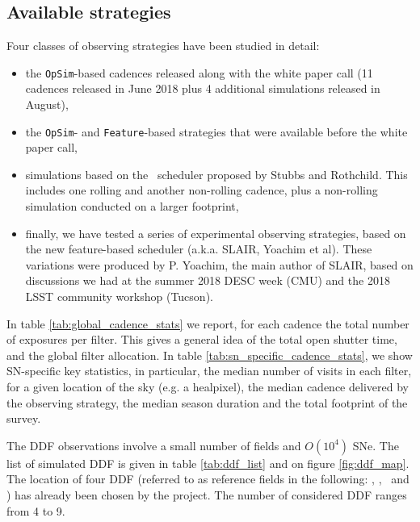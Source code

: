 
\subsection{Available strategies}

Four classes of observing strategies have been studied in detail:
\begin{itemize}

\item the {\tt OpSim}-based cadences released along with the white
  paper call (11 cadences released in June 2018 plus 4 additional
  simulations released in August), 
  
\item the {\tt OpSim}- and {\tt Feature}-based strategies that were
  available before the white paper call,

\item simulations based on the \altschedsched~scheduler proposed by
  Stubbs and Rothchild.  This includes one rolling and another
  non-rolling cadence, plus a non-rolling simulation conducted on a
  larger footprint,

\item finally, we have tested a series of experimental observing
  strategies, based on the new feature-based scheduler (a.k.a.  SLAIR,
  Yoachim et al). These variations were produced by P. Yoachim, the
  main author of SLAIR, based on discussions we had at the summer 2018
  DESC week (CMU) and the 2018 LSST community workshop (Tucson).
\end{itemize}

In table \ref{tab:global_cadence_stats} we report, for each cadence
the total number of exposures per filter. This gives a general idea of
the total open shutter time, and the global filter allocation.  In
table \ref{tab:sn_specific_cadence_stats}, we show SN-specific key
statistics, in particular, the median number of visits in each filter,
for a given location of the sky (e.g. a healpixel), the median cadence
delivered by the observing strategy, the median season duration and
the total footprint of the survey.

The DDF  observations involve a  small number of fields  and $O(10^4)$
SNe. The list of simulated DDF is given in table
\ref{tab:ddf_list} and on figure \ref{fig:ddf_map}. The location of four DDF (referred to as reference fields in the following: \cosmos, \xmmlss, \cdfs~and \elais) has already been chosen by the project. The number of considered DDF ranges from 4 to 9.


